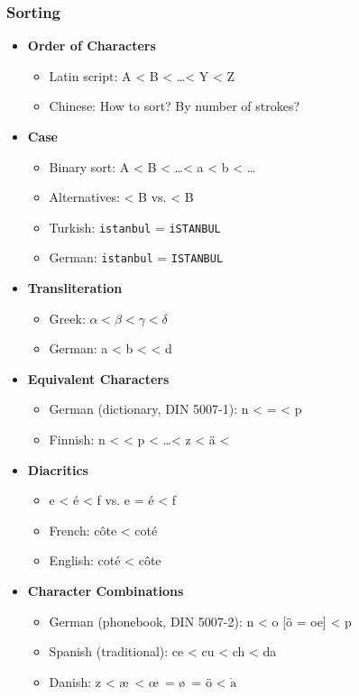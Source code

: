			\subsubsection{Sorting} %
				\begin{itemize}
					\item \textbf{Order of Characters}
						\begin{itemize}
							\item Latin script: A < B < \dots < Y < Z
							\item Chinese: How to sort? By number of strokes?
						\end{itemize}
					\item \textbf{Case}
						\begin{itemize}
							\item Binary sort: A < B < \dots < a < b < \dots
							\item Alternatives:  < B vs.  < B
							\item Turkish: \texttt{istanbul} = \texttt{iSTANBUL}
							\item German: \texttt{istanbul} = \texttt{ISTANBUL}
						\end{itemize}
					\item \textbf{Transliteration}
						\begin{itemize}
							\item Greek: \( \alpha < \beta < \gamma < \delta \)
							\item German: a < b <  < d
						\end{itemize}
					\item \textbf{Equivalent Characters}
						\begin{itemize}
							\item German (dictionary, DIN 5007-1): n <  =  < p
							\item Finnish: n <  < p < \dots < z < ä < 
						\end{itemize}
					\item \textbf{Diacritics}
						\begin{itemize}
							\item e < {\'e} < f vs. e = {\'e} < f
							\item French: c{\^o}te < cot{\'e}
							\item English: cot{\'e} < c{\^o}te
						\end{itemize}
					\item \textbf{Character Combinations}
						\begin{itemize}
							\item German (phonebook, DIN 5007-2): n < o [ö = oe] < p
							\item Spanish (traditional): ce < cu < ch < da
							\item Danish: z < \ae \, < \! \oe \, = \o \, = ö < \(\mathring{\text{a}}\)
						\end{itemize}
				\end{itemize}

